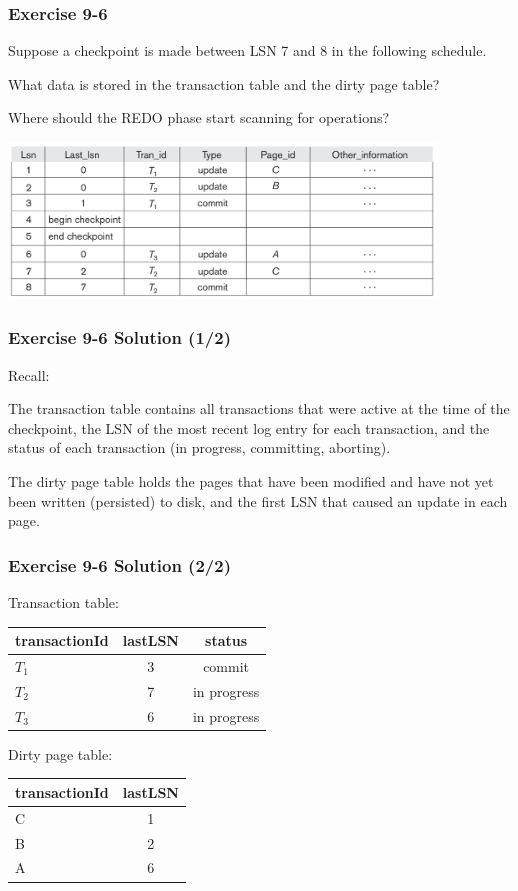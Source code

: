 \begin{frame}
\frametitle{Exercise 9-6}
  Suppose a checkpoint is made between LSN 7 and 8 in the following schedule.

  What data is stored in the transaction table and the dirty page table?

  Where should the REDO phase start scanning for operations?

  \begin{center}
  \includegraphics[width=0.85\textwidth]{images/aries-1}\\
  \end{center}
\end{frame}


\begin{frame}
\frametitle{Exercise 9-6 Solution (1/2)}

Recall:

The transaction table contains all transactions that were active at the time of the checkpoint, the LSN of the most recent log entry for each transaction, and the status of each transaction (in progress, committing, aborting).

The dirty page table holds the pages that have been modified and have not yet been written (persisted) to disk, and the first LSN that caused an update in each page.

\end{frame}


\begin{frame}
\frametitle{Exercise 9-6 Solution (2/2)}

Transaction table:
\begin{center}
\begin{tabular}{ | l | c | c | }
  \hline
  transactionId & lastLSN & status \\
  \hline
  $T_1$ & 3 & commit \\
  \hline
  $T_2$ & 7 & in progress \\
  \hline
  $T_3$ & 6 & in progress \\
  \hline
\end{tabular}
\end{center}

Dirty page table:
\begin{center}
\begin{tabular}{ | l | c | }
  \hline
  transactionId & lastLSN \\
  \hline
  C & 1 \\
  \hline
  B & 2 \\
  \hline
  A & 6 \\
  \hline
\end{tabular}
\end{center}

\end{frame}




